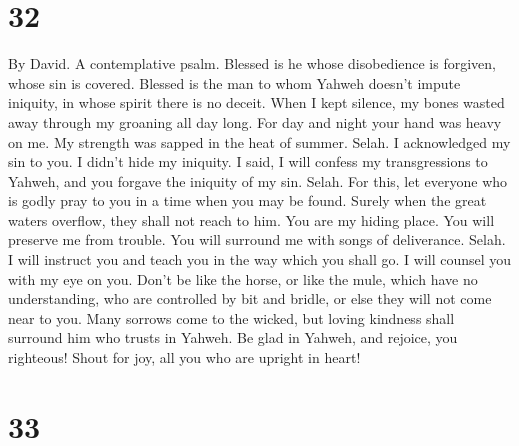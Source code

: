 \hypertarget{section-31}{%
\section{32}\label{section-31}}

By David. A contemplative psalm.  Blessed is he whose
disobedience is forgiven, whose sin is covered.  Blessed
is the man to whom Yahweh doesn't impute iniquity, in whose spirit there
is no deceit.  When I kept silence, my bones wasted away
through my groaning all day long.  For day and night your
hand was heavy on me. My strength was sapped in the heat of summer.
Selah.  I acknowledged my sin to you. I didn't hide my
iniquity. I said, I will confess my transgressions to Yahweh, and you
forgave the iniquity of my sin. Selah.  For this, let
everyone who is godly pray to you in a time when you may be found.
Surely when the great waters overflow, they shall not reach to him.
 You are my hiding place. You will preserve me from
trouble. You will surround me with songs of deliverance. Selah.
 I will instruct you and teach you in the way which you
shall go. I will counsel you with my eye on you.  Don't be
like the horse, or like the mule, which have no understanding, who are
controlled by bit and bridle, or else they will not come near to you.
 Many sorrows come to the wicked, but loving kindness
shall surround him who trusts in Yahweh.  Be glad in
Yahweh, and rejoice, you righteous! Shout for joy, all you who are
upright in heart!

\hypertarget{section-32}{%
\section{33}\label{section-32}}

